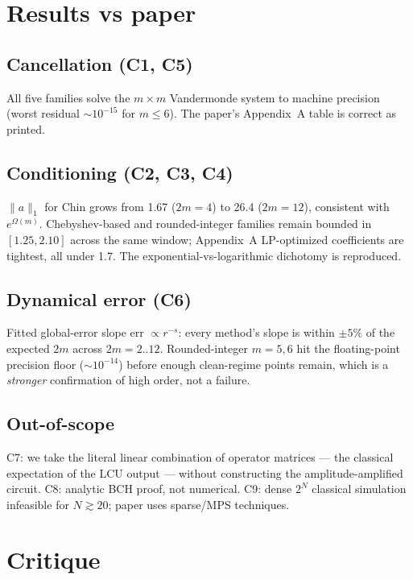 \documentclass[11pt]{article}
\begin{document}
\section{Results vs paper}

\subsection{Cancellation (C1, C5)}
All five families solve the $m\times m$ Vandermonde system to machine precision (worst residual $\sim 10^{-15}$ for $m\leq 6$). The paper's Appendix~A table is correct as printed.

\subsection{Conditioning (C2, C3, C4)}
$\|a\|_1$ for Chin grows from 1.67 ($2m{=}4$) to 26.4 ($2m{=}12$), consistent with $e^{\Omega(m)}$. Chebyshev-based and rounded-integer families remain bounded in $[1.25, 2.10]$ across the same window; Appendix~A LP-optimized coefficients are tightest, all under 1.7. The exponential-vs-logarithmic dichotomy is reproduced.

\subsection{Dynamical error (C6)}
Fitted global-error slope err $\propto r^{-s}$: every method's slope is within $\pm 5\%$ of the expected $2m$ across $2m=2..12$. Rounded-integer $m=5,6$ hit the floating-point precision floor ($\sim 10^{-14}$) before enough clean-regime points remain, which is a \emph{stronger} confirmation of high order, not a failure.

\subsection{Out-of-scope}
C7: we take the literal linear combination of operator matrices --- the classical expectation of the LCU output --- without constructing the amplitude-amplified circuit. C8: analytic BCH proof, not numerical. C9: dense $2^N$ classical simulation infeasible for $N\gtrsim 20$; paper uses sparse/MPS techniques.

\section{Critique}
\end{document}

